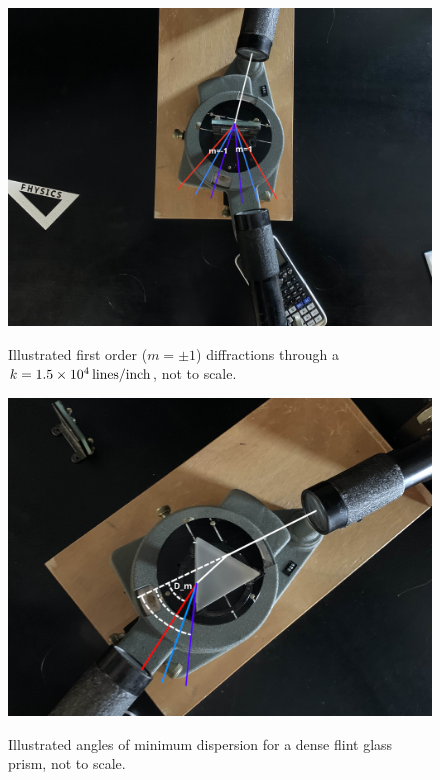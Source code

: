 \documentclass[10pt, twocolumn]{article}
\theoremstyle{definition}
\begin{document}
\begin{figure}[ht]
  \centering%
  \caption{Illustrated first order ($m=\pm1$) diffractions through a $k=\qty{1.5d4}{lines\per inch}$, not to scale.}
  \includegraphics[scale=0.1]{Grating Above.jpg}
  \label{grat}
\end{figure}

\begin{figure}[ht]
  \centering%
  \caption{Illustrated angles of minimum dispersion for a dense flint glass prism, not to scale.}
  \includegraphics[scale=0.55]{Prism Above.jpg}
  \label{pris}
\end{figure}
\end{document}
